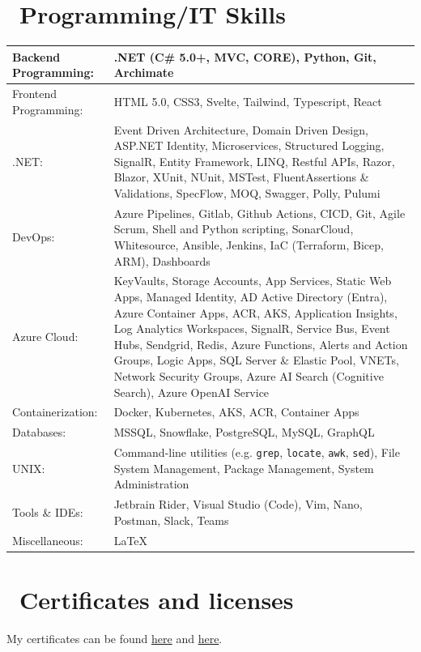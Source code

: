 \documentclass[a4paper,8pt]{article}
\begin{document}
\section{\faTerminal\ Programming/IT Skills}
\begin{tabular}{||p{5cm}|p{8cm}||}
\hline
Backend Programming: &  .NET (C\# 5.0+, MVC, CORE), Python, Git, Archimate \\
\hline
Frontend Programming: & HTML 5.0, CSS3, Svelte, Tailwind, Typescript, React \\
\hline
.NET:& Event Driven Architecture, Domain Driven Design, ASP.NET Identity, Microservices, Structured Logging, SignalR, Entity Framework, LINQ, Restful APIs, Razor, Blazor, XUnit, NUnit, MSTest, FluentAssertions \& Validations, SpecFlow, MOQ, Swagger, Polly, Pulumi \\
\hline
DevOps: & Azure Pipelines, Gitlab, Github Actions, CI\/CD, Git, Agile Scrum, Shell and Python scripting, SonarCloud, Whitesource, Ansible, Jenkins, IaC (Terraform, Bicep, ARM), Dashboards \\
\hline
Azure Cloud: & KeyVaults, Storage Accounts, App Services, Static Web Apps,
Managed Identity, AD Active Directory (Entra), Azure
Container Apps, ACR, AKS,
Application Insights, Log Analytics Workspaces,
SignalR, Service Bus, Event Hubs, Sendgrid, Redis,
Azure Functions, Alerts and Action Groups, Logic Apps,
SQL Server \& Elastic Pool, VNETs, Network Security Groups,
Azure AI Search (Cognitive Search), Azure OpenAI Service \\
\hline
Containerization: & Docker, Kubernetes, AKS, ACR, Container Apps \\
\hline
Databases: & MSSQL, Snowflake, PostgreSQL, MySQL, GraphQL \\
\hline
UNIX: & Command-line utilities (e.g. \verb|grep|, \verb|locate|, \verb|awk|, \verb|sed|), File System Management, Package Management, System Administration \\
\hline
Tools \& IDEs: & Jetbrain Rider, Visual Studio (Code), Vim, Nano, Postman, Slack, Teams \\
\hline
Miscellaneous: & \LaTeX \\
\hline
\end{tabular}

\section{\faTrophy\ Certificates and licenses}
My certificates can be found \hyperlink{https://www.credly.com/users/casper-dijkstra/badges}{here} and \hyperlink{https://learn.microsoft.com/en-us/users/casperdijkstra-0464/transcript/v2n6nap36zq90xk?tab=credentials-tab}{here}.
\end{document}
